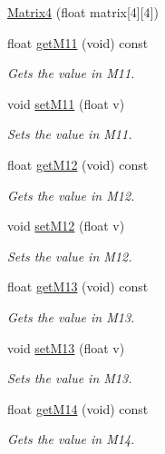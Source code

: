 \begin{DoxyCompactItemize}
\item 
\hyperlink{class_matrix4_a03594ff6166caf6c9d570d26364687d4}{\-Matrix4} (float matrix\mbox{[}4\mbox{]}\mbox{[}4\mbox{]})
\item 
float \hyperlink{class_matrix4_af6c1f9a8d09d989e952f3b21439dc654}{get\-M11} (void) const 
\begin{DoxyCompactList}\small\item\em \-Gets the value in \-M11. \end{DoxyCompactList}\item 
void \hyperlink{class_matrix4_ad6e8ea132df4f6378f0c69a0cba2d72a}{set\-M11} (float v)
\begin{DoxyCompactList}\small\item\em \-Sets the value in \-M11. \end{DoxyCompactList}\item 
float \hyperlink{class_matrix4_a79e6fe0a157abc7f09329f9805daf412}{get\-M12} (void) const 
\begin{DoxyCompactList}\small\item\em \-Gets the value in \-M12. \end{DoxyCompactList}\item 
void \hyperlink{class_matrix4_a4dff62a2552b1b3edec8b33e4d325a46}{set\-M12} (float v)
\begin{DoxyCompactList}\small\item\em \-Sets the value in \-M12. \end{DoxyCompactList}\item 
float \hyperlink{class_matrix4_ad5a16cd71742f4464fc334a54f0e6356}{get\-M13} (void) const 
\begin{DoxyCompactList}\small\item\em \-Gets the value in \-M13. \end{DoxyCompactList}\item 
void \hyperlink{class_matrix4_ac83d6e40c74df2bb9359738b9b30a758}{set\-M13} (float v)
\begin{DoxyCompactList}\small\item\em \-Sets the value in \-M13. \end{DoxyCompactList}\item 
float \hyperlink{class_matrix4_adccf95daa15fb8958d7560c74f7434b8}{get\-M14} (void) const 
\begin{DoxyCompactList}\small\item\em \-Gets the value in \-M14. \end{DoxyCompactList}\item 

\end{DoxyCompactItemize}
